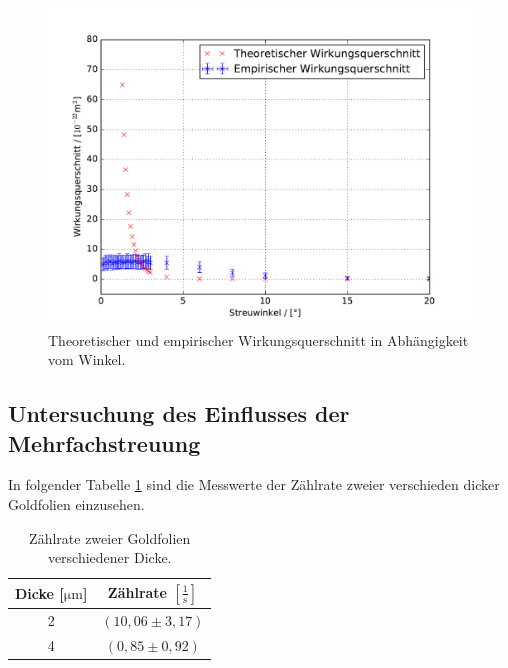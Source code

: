 \begin{figure}[H]
  \centering
  \includegraphics[width=\textwidth]{WQ.pdf}
  \caption{Theoretischer und empirischer Wirkungsquerschnitt in Abhängigkeit vom Winkel.}
  \label{fig:WQ}
\end{figure}


\subsection{Untersuchung des Einflusses der Mehrfachstreuung}
\label{kap:mfs}
In folgender Tabelle \ref{tab:mfs} sind die Messwerte der Zählrate zweier verschieden dicker Goldfolien einzusehen.

\begin{table}[H]
  \centering
  \begin{tabular}{cc}
    \toprule
    Dicke [$\si{\micro\metre}$] & Zählrate $\left[\frac{1}{\text{s}}\right]$ \\
    \midrule
    2 & $(10,06\pm3,17)$\\
    4 & $(0,85\pm0,92)$\\
    \bottomrule
  \end{tabular}
  \caption{Zählrate zweier Goldfolien verschiedener Dicke.}
  \label{tab:mfs}
\end{table}

